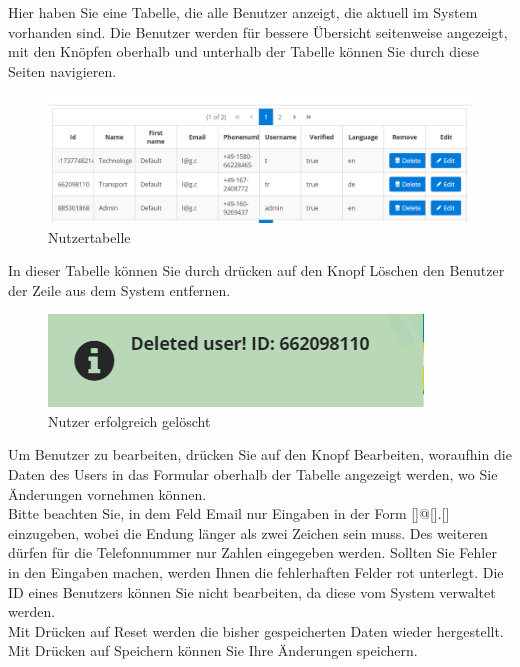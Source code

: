 \documentclass[enabledeprecatedfontcommands,fontsize=12pt,paper=a4,twoside]{scrartcl}
\begin{document}
Hier haben Sie eine Tabelle, die alle Benutzer anzeigt, die aktuell im System vorhanden sind. Die Benutzer werden für bessere Übersicht seitenweise angezeigt, mit den Knöpfen oberhalb und unterhalb der Tabelle können Sie durch diese Seiten navigieren.\\

\begin{figure}[h!]
\begin{center}
 \includegraphics[width=\textwidth]{screenshots/admin/nutzertabelle.png}
  \caption{Nutzertabelle}
  \label{fig:boat1}
\end{center}
\end{figure}

 In dieser Tabelle können Sie durch drücken auf den Knopf Löschen den Benutzer der Zeile aus dem System entfernen.  \\
\begin{figure}[h!]
\begin{center}
 \includegraphics[width=\textwidth]{screenshots/admin/nutzerloeschen.png}
  \caption{Nutzer erfolgreich gelöscht}
  \label{fig:boat2}
\end{center}
\end{figure}

Um Benutzer zu bearbeiten, drücken Sie auf den Knopf Bearbeiten, woraufhin die Daten des Users in das Formular oberhalb der Tabelle angezeigt werden, wo Sie Änderungen vornehmen können. \\
Bitte beachten Sie, in dem Feld Email nur Eingaben in der Form []@[].[] einzugeben, wobei die Endung länger als zwei Zeichen sein muss. Des weiteren dürfen für die Telefonnummer nur Zahlen eingegeben werden. Sollten Sie Fehler in den Eingaben machen, werden Ihnen die fehlerhaften Felder rot unterlegt. Die ID eines Benutzers können Sie nicht bearbeiten, da diese vom System verwaltet werden. \\
Mit Drücken auf Reset werden die bisher gespeicherten Daten wieder hergestellt. Mit Drücken auf Speichern können Sie Ihre Änderungen speichern. \\
\end{document}
